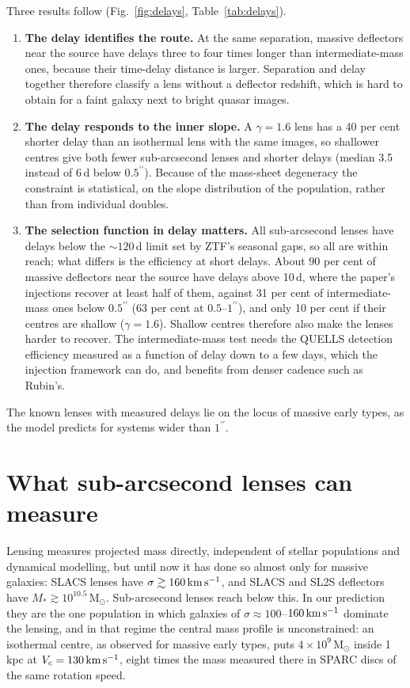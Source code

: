 \documentclass[11pt,a4paper]{article}
\newcommand{\msun}{\mathrm{M}_\odot}
\newcommand{\arcsecond}{^{\prime\prime}}
\newcommand{\kms}{\,{\rm km\,s^{-1}}}
\begin{document}
Three results follow (Fig.~\ref{fig:delays}, Table~\ref{tab:delays}).
\begin{enumerate}
\item \textbf{The delay identifies the route.} At the same separation, massive deflectors near the source have delays three to four times longer than intermediate-mass ones, because their time-delay distance is larger. Separation and delay together therefore classify a lens without a deflector redshift, which is hard to obtain for a faint galaxy next to bright quasar images.
\item \textbf{The delay responds to the inner slope.} A $\gamma=1.6$ lens has a 40 per cent shorter delay than an isothermal lens with the same images, so shallower centres give both fewer sub-arcsecond lenses and shorter delays (median 3.5 instead of 6\,d below $0.5\arcsecond$). Because of the mass-sheet degeneracy the constraint is statistical, on the slope distribution of the population, rather than from individual doubles.
\item \textbf{The selection function in delay matters.} All sub-arcsecond lenses have delays below the $\sim120$\,d limit set by ZTF's seasonal gaps, so all are within reach; what differs is the efficiency at short delays. About 90 per cent of massive deflectors near the source have delays above 10\,d, where the paper's injections recover at least half of them, against 31 per cent of intermediate-mass ones below $0.5\arcsecond$ (63 per cent at $0.5$--$1\arcsecond$), and only 10 per cent if their centres are shallow ($\gamma=1.6$). Shallow centres therefore also make the lenses harder to recover. The intermediate-mass test needs the QUELLS detection efficiency measured as a function of delay down to a few days, which the injection framework can do, and benefits from denser cadence such as Rubin's.
\end{enumerate}
The known lenses with measured delays lie on the locus of massive early types, as the model predicts for systems wider than $1\arcsecond$.

\section{What sub-arcsecond lenses can measure}

Lensing measures projected mass directly, independent of stellar populations and dynamical modelling, but until now it has done so almost only for massive galaxies: SLACS lenses have $\sigma\gtrsim160\kms$, and SLACS and SL2S deflectors have $M_*\gtrsim10^{10.5}\,\msun$. Sub-arcsecond lenses reach below this. In our prediction they are the one population in which galaxies of $\sigma\approx100$--$160\kms$ dominate the lensing, and in that regime the central mass profile is unconstrained: an isothermal centre, as observed for massive early types, puts $4\times10^9\,\msun$ inside 1\,kpc at $V_c=130\kms$, eight times the mass measured there in SPARC discs of the same rotation speed.
\end{document}

